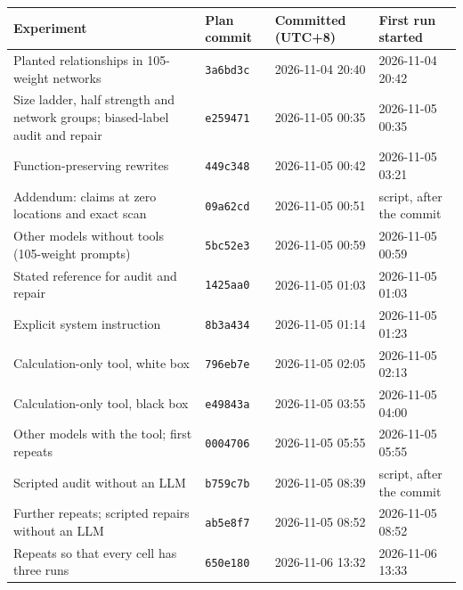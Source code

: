 \begin{tabular}{llll}
\toprule
Experiment & Plan commit & Committed (UTC+8) & First run started \\
\midrule
Planted relationships in 105-weight networks & \texttt{3a6bd3c} & 2026-11-04 20:40 & 2026-11-04 20:42 \\
Size ladder, half strength and network groups; biased-label audit and repair & \texttt{e259471} & 2026-11-05 00:35 & 2026-11-05 00:35 \\
Function-preserving rewrites & \texttt{449c348} & 2026-11-05 00:42 & 2026-11-05 03:21 \\
Addendum: claims at zero locations and exact scan & \texttt{09a62cd} & 2026-11-05 00:51 & script, after the commit \\
Other models without tools (105-weight prompts) & \texttt{5bc52e3} & 2026-11-05 00:59 & 2026-11-05 00:59 \\
Stated reference for audit and repair & \texttt{1425aa0} & 2026-11-05 01:03 & 2026-11-05 01:03 \\
Explicit system instruction & \texttt{8b3a434} & 2026-11-05 01:14 & 2026-11-05 01:23 \\
Calculation-only tool, white box & \texttt{796eb7e} & 2026-11-05 02:05 & 2026-11-05 02:13 \\
Calculation-only tool, black box & \texttt{e49843a} & 2026-11-05 03:55 & 2026-11-05 04:00 \\
Other models with the tool; first repeats & \texttt{0004706} & 2026-11-05 05:55 & 2026-11-05 05:55 \\
Scripted audit without an LLM & \texttt{b759c7b} & 2026-11-05 08:39 & script, after the commit \\
Further repeats; scripted repairs without an LLM & \texttt{ab5e8f7} & 2026-11-05 08:52 & 2026-11-05 08:52 \\
Repeats so that every cell has three runs & \texttt{650e180} & 2026-11-06 13:32 & 2026-11-06 13:33 \\
\bottomrule
\end{tabular}
